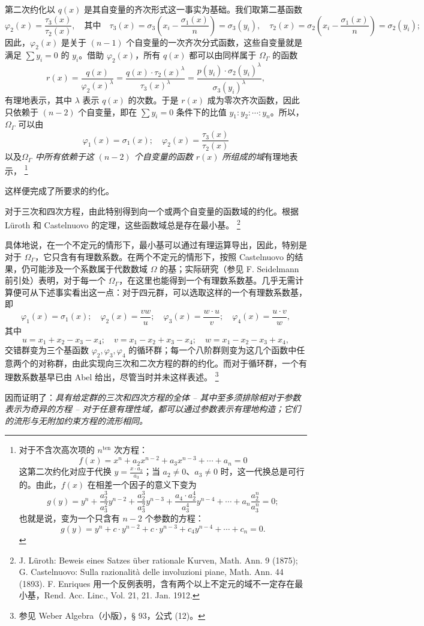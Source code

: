 \documentclass[11pt]{article}
\providecommand{\srcfn}[2]{%
  \begingroup
  \renewcommand{\thefootnote}{#1}%
  \footnote{#2}%
  \addtocounter{footnote}{-1}%
  \endgroup}
\begin{document}
第二次约化以 $q(x)$ 是其自变量的齐次形式这一事实为基础。我们取第二基函数
\[
\varphi_2(x)=\frac{\tau_3(x)}{\tau_2(x)},\quad \text{其中}\quad
\tau_3(x)=\sigma_3\left(x_i-\frac{\sigma_1(x)}{n}\right)=\sigma_3(y_i),\quad
\tau_2(x)=\sigma_2\left(x_i-\frac{\sigma_1(x)}{n}\right)=\sigma_2(y_i);
\]
因此，$\varphi_2(x)$ 是关于 $(n-1)$ 个自变量的一次齐次分式函数，这些自变量就是满足 $\sum y_i=0$ 的 $y_i$。借助 $\varphi_2(x)$，所有 $q(x)$ 都可以由同样属于 $\Omega_\Gamma$ 的函数
\[
r(x)=\frac{q(x)}{\varphi_2(x)^\lambda}=\frac{q(x)\cdot\tau_2(x)^\lambda}{\tau_3(x)^\lambda}=\frac{p(y_i)\cdot\sigma_2(y_i)^\lambda}{\sigma_3(y_i)^\lambda},
\]
有理地表示，其中 $\lambda$ 表示 $q(x)$ 的次数。于是 $r(x)$ 成为零次齐次函数，因此只依赖于 $(n-2)$ 个自变量，即在 $\sum y_i=0$ 条件下的比值 $y_1:y_2:\cdots:y_n$。所以，$\Omega_\Gamma$ 可以由
\[
\varphi_1(x)=\sigma_1(x);\quad \varphi_2(x)=\frac{\tau_3(x)}{\tau_2(x)}
\]
以及\emph{$\Omega_\Gamma$ 中所有依赖于这 $(n-2)$ 个自变量的函数 $r(x)$ 所组成的域}有理地表示，\srcfn{*)}{对于不含次高次项的 $n^{\text{ten}}$ 次方程：
\[
f(x)=x^n+a_2x^{n-2}+a_3x^{n-3}+\cdots+a_n=0
\]
这第二次约化对应于代换 $y=\frac{x\cdot a_2}{a_3}$；当 $a_2\neq0$、$a_3\neq0$ 时，这一代换总是可行的。由此，$f(x)$ 在相差一个因子的意义下变为
\[
g(y)=y^n+\frac{a_2^3}{a_3^2}y^{n-2}+\frac{a_2^3}{a_3^2}y^{n-3}+\frac{a_4\cdot a_2^4}{a_3^4}y^{n-4}+\cdots+a_n\frac{a_2^n}{a_3^n}=0;
\]
也就是说，变为一个只含有 $n-2$ 个参数的方程：
\[
g(y)=y^n+c\cdot y^{n-2}+c\cdot y^{n-3}+c_4y^{n-4}+\cdots+c_n=0.
\]} 这样便完成了所要求的约化。

对于三次和四次方程，由此特别得到向一个或两个自变量的函数域的约化。根据 Lüroth 和 Castelnuovo 的定理，这些函数域总是存在最小基。\srcfn{**)}{J. Lüroth: Beweis eines Satzes über rationale Kurven, Math. Ann. 9 (1875); G. Castelnuovo: Sulla razionalità delle involuzioni piane, Math. Ann. 44 (1893). F. Enriques 用一个反例表明，含有两个以上不定元的域不一定存在最小基，Rend. Acc. Linc., Vol. 21, 21. Jan. 1912.} 具体地说，在一个不定元的情形下，最小基可以通过有理运算导出，因此，特别是对于 $\Omega_\Gamma$，它只含有有理数系数。在两个不定元的情形下，按照 Castelnuovo 的结果，仍可能涉及一个系数属于代数数域 $\Omega$ 的基；实际研究（参见 F. Seidelmann 前引处）表明，对于每一个 $\Omega_\Gamma$，在这里也能得到一个有理数系数基。几乎无需计算便可从下述事实看出这一点：对于四元群，可以选取这样的一个有理数系数基，即
\[
\varphi_1(x)=\sigma_1(x);\quad \varphi_2(x)=\frac{v w}{u};\quad \varphi_3(x)=\frac{w\cdot u}{v};\quad \varphi_4(x)=\frac{u\cdot v}{w},
\]
其中
\[
u=x_1+x_2-x_3-x_4;\quad v=x_1-x_2+x_3-x_4;\quad w=x_1-x_2-x_3+x_4,
\]
交错群变为三个基函数 $\varphi_2,\varphi_3,\varphi_4$ 的循环群；每一个八阶群则变为这几个函数中任意两个的对称群，由此实现向三次和二次方程的群的约化。而对于循环群，一个有理数系数基早已由 Abel 给出，尽管当时并未这样表述。\srcfn{*)}{参见 Weber Algebra（小版），§ 93，公式 (12)。} 因而证明了：\emph{具有给定群的三次和四次方程的全体 -- 其中至多须排除相对于参数表示为奇异的方程 -- 对于任意有理性域，都可以通过参数表示有理地构造；它们的流形与无附加约束方程的流形相同。}
\end{document}

